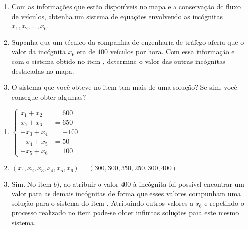 \documentclass[10 pt,usenames,dvipsnames, oneside]{article}
\begin{document}
\begin{enumerate}
\item{}
Com as informações que estão disponíveis no mapa e a conservação do fluxo de veículos, obtenha um sistema de equações envolvendo as incógnitas $x_1,x_2,..., x_6$.

\item{}
Suponha que um técnico da companhia de engenharia de tráfego aferiu que o valor da incógnita $x_6$ era de $400$ veículos por hora. Com essa informação e com o sistema obtido no item , determine o valor das outras incógnitas destacadas no mapa. 

\item{}
O sistema que você obteve no item  tem mais de uma solução? Se sim, você consegue obter algumas?

\end{enumerate}

\ifdefined\prof
\begin{solucao}

\begin{enumerate}
\item 
$\left \{
\begin{aligned}
x_1+x_2&=600\\
x_2+x_3&=650\\
-x_3+x_4&=-100\\
-x_4+x_5&=50\\
-x_5+x_6&=100
\end{aligned}
\right.$
\item $(x_1,x_2,x_3,x_4,x_5,x_6)=(300,300,350,250,300,400)$
\item Sim. No item $b)$, ao atribuir o valor $400$ à incógnita  foi possível encontrar um valor para as demais incógnitas de forma que esses valores compunham uma solução para o sistema do item . Atribuindo outros valores a $x_6$ e repetindo o processo realizado no item  pode-se obter infinitas soluções para este mesmo sistema.
\end{enumerate}

\end{solucao}
\fi
\end{document}
